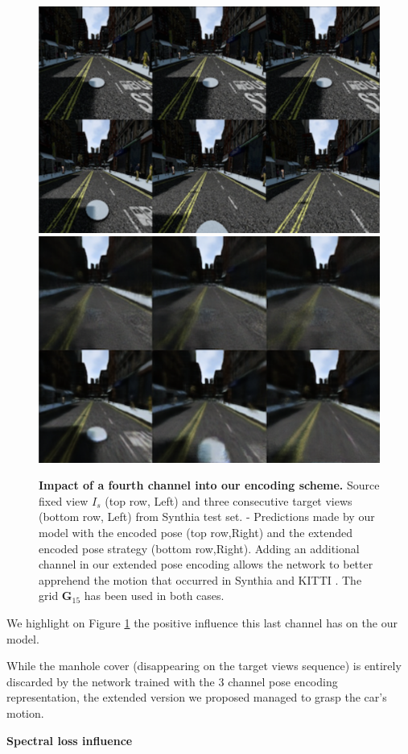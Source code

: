 \begin{figure}[htp]

\begin{center}
\includegraphics[width=.45\textwidth]{images/epipolarnvs/ablationSynthia.png} \hfill
\includegraphics[width=.45\textwidth]{images/epipolarnvs/ablationSynthia2.png}
\end{center}
\caption{\textbf{Impact of a fourth channel into our encoding scheme.} Source fixed view $I_s$ (top row, Left) and three consecutive target views (bottom row, Left) from Synthia \cite{ros2016synthia} test set. - Predictions made by our model with the encoded pose (top row,Right) and the extended encoded pose strategy (bottom row,Right). Adding an additional channel in our extended pose encoding allows the network to better apprehend the motion that occurred in Synthia \cite{ros2016synthia} and KITTI \cite{geiger2012we}. The grid $\textbf{G}_{15}$ has been used in both cases.}
\label{fig:ablaSynthia}
\end{figure}
We highlight on Figure \ref{fig:ablaSynthia} the positive influence this last channel has on the our model. 

While the manhole cover (disappearing on the target views sequence) is entirely discarded by the network trained with the 3 channel pose encoding representation, the extended version we proposed managed to grasp the car's motion.\newline 

\textbf{Spectral loss influence}

